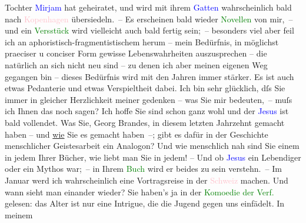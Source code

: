                Tochter \textcolor{blue}{Mirjam}{}\ledrightnote{\textcolor{blue}{Mirjam Beer-Hofmann}} hat geheiratet, und wird mit ihrem
                  \textcolor{blue}{Gatten}{} wahrscheinlich bald
               nach \textcolor{pink}{Kopenhagen}{}\ledrightnote{\textcolor{pink}{Kopenhagen}} übersiedeln. –\pend
           \pstart
           Es erscheinen bald wieder \textcolor{green}{Novellen}{} von mir, – und ein \textcolor{green}{Versstück}{} wird vielleicht auch bald fertig sein; – besonders viel aber feil
               ich an aphoristisch-fragmentistischem herum – mein Bedürfnis, in möglichst  praeciser u conciser Form gewisse Lebenswahrheiten
               auszusprechen – die natürlich an sich nicht neu sind – zu denen ich aber meinen
               eigenen Weg gegangen bin – dieses Bedürfnis wird mit den Jahren immer stärker. Es ist
               auch etwas Pedanterie und etwas Verspieltheit dabei.\pend
           \pstart
           Ich bin sehr glücklich, dſs Sie immer in gleicher Herzlichkeit meiner gedenken – was
               Sie mir bedeuten, – muſs ich Ihnen das noch sagen? Ich hoffe Sie sind schon ganz wohl
               und der \textcolor{green}{\textcolor{blue}{Jesus}{}\ledrightnote{\textcolor{blue}{Jesus}}}{} ist bald vollendet. Was Sie, Georg Brandes, {\pb}in diesem letzten Jahrzehnt gemacht haben – und \uline{wie}
               Sie es gemacht haben –; gibt es dafür in der Geschichte menschlicher Geistesarbeit
               ein Analogon? Und wie menschlich nah sind Sie einem \introOben{}in\introOben{} jedem
               Ihrer Bücher, wie liebt man Sie in jedem! – Und ob \textcolor{blue}{Jesus}{}\ledrightnote{\textcolor{blue}{Jesus}} ein Lebendiger oder ein Mythos war; – in Ihrem \textcolor{green}{Buch}{} wird er beides zu sein verstehn. –\pend
           \pstart
           Im Januar werd ich wahrscheinlich eine Vortragsreise in der \textcolor{pink}{Schweiz}{}\ledrightnote{\textcolor{pink}{Schweiz}} machen. Und wann sieht man einander wieder?
               Sie haben's ja in der \textcolor{green}{Komoedie der Verf.}{}\ledrightnote{\textcolor{green}{Komödie der Verführung. In drei Akten}} gelesen:
               das Alter ist nur eine Intrigue, die die Jugend gegen uns einfädelt. In meinem
